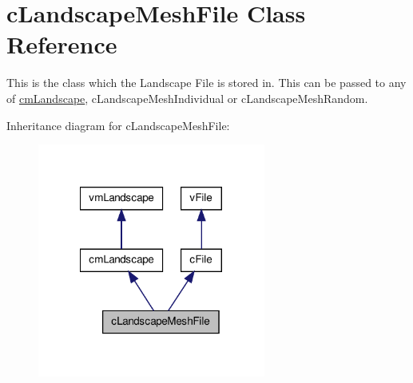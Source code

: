 \hypertarget{classc_landscape_mesh_file}{
\section{cLandscapeMeshFile Class Reference}
\label{classc_landscape_mesh_file}
}


This is the class which the Landscape File is stored in. This can be passed to any of \hyperlink{classcm_landscape}{cmLandscape}, cLandscapeMeshIndividual or cLandscapeMeshRandom.  




Inheritance diagram for cLandscapeMeshFile:
\nopagebreak
\begin{figure}[H]
\begin{center}
\leavevmode
\includegraphics[width=212pt]{classc_landscape_mesh_file__inherit__graph}
\end{center}
\end{figure}



